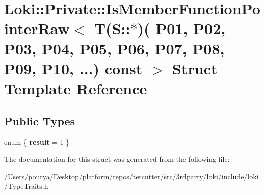 \hypertarget{structLoki_1_1Private_1_1IsMemberFunctionPointerRaw_3_01T_07S_1_1_5_08_07_01_01_01_01_01_01_01_0e1d930e516ecee0eeb2bb7cb1666aa6c}{}\section{Loki\+:\+:Private\+:\+:Is\+Member\+Function\+Pointer\+Raw$<$ T(S\+:\+:$\ast$)( P01, P02, P03, P04, P05, P06, P07, P08, P09, P10, ...) const $>$ Struct Template Reference}
\label{structLoki_1_1Private_1_1IsMemberFunctionPointerRaw_3_01T_07S_1_1_5_08_07_01_01_01_01_01_01_01_0e1d930e516ecee0eeb2bb7cb1666aa6c}
\subsection*{Public Types}
\begin{DoxyCompactItemize}
\item 
\hypertarget{structLoki_1_1Private_1_1IsMemberFunctionPointerRaw_3_01T_07S_1_1_5_08_07_01_01_01_01_01_01_01_0e1d930e516ecee0eeb2bb7cb1666aa6c_ab156904aa5e343920bd990398c678fca}{}enum \{ {\bfseries result} = 1
 \}\label{structLoki_1_1Private_1_1IsMemberFunctionPointerRaw_3_01T_07S_1_1_5_08_07_01_01_01_01_01_01_01_0e1d930e516ecee0eeb2bb7cb1666aa6c_ab156904aa5e343920bd990398c678fca}

\end{DoxyCompactItemize}


The documentation for this struct was generated from the following file\+:\begin{DoxyCompactItemize}
\item 
/\+Users/pourya/\+Desktop/platform/repos/tetcutter/src/3rdparty/loki/include/loki/Type\+Traits.\+h\end{DoxyCompactItemize}
